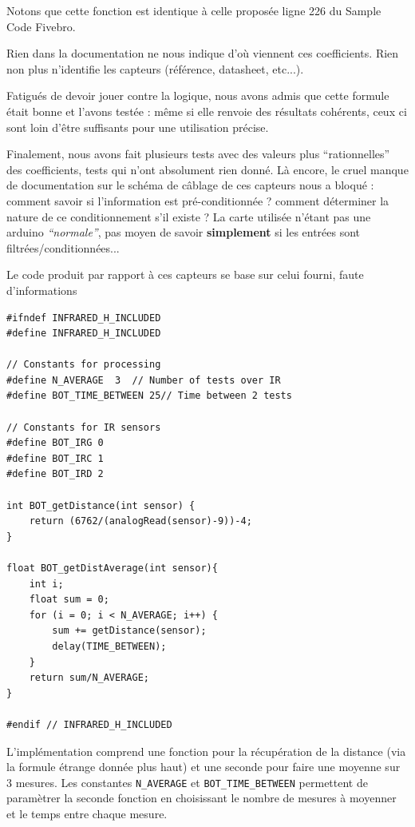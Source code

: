 \documentclass[a4paper]{report}
\begin{document}
Notons que cette fonction est identique à celle proposée ligne 226 du Sample Code Fivebro.

Rien dans la documentation ne nous indique d'où viennent ces coefficients.
Rien non plus n'identifie les capteurs (référence, datasheet, etc...).

Fatigués de devoir jouer contre la logique, nous avons admis que cette formule était bonne et l'avons testée : même si elle renvoie des résultats cohérents, ceux ci sont loin d'être suffisants pour une utilisation précise.

Finalement, nous avons fait plusieurs tests avec des valeurs plus ``rationnelles'' des coefficients, tests qui n'ont absolument rien donné.
Là encore, le cruel manque de documentation sur le schéma de câblage de ces capteurs nous a bloqué : comment savoir si l'information est pré-conditionnée ? comment déterminer la nature de ce conditionnement s'il existe ?
La carte utilisée n'étant pas une arduino \emph{``normale''}, pas moyen de savoir \textbf{simplement} si les entrées sont filtrées/conditionnées...

Le code produit par rapport à ces capteurs se base sur celui fourni, faute d'informations

\begin{verbatim}
#ifndef INFRARED_H_INCLUDED
#define INFRARED_H_INCLUDED

// Constants for processing
#define N_AVERAGE  3  // Number of tests over IR
#define BOT_TIME_BETWEEN 25// Time between 2 tests

// Constants for IR sensors
#define BOT_IRG 0
#define BOT_IRC 1
#define BOT_IRD 2

int BOT_getDistance(int sensor) {
    return (6762/(analogRead(sensor)-9))-4;
}

float BOT_getDistAverage(int sensor){
    int i;
    float sum = 0;
    for (i = 0; i < N_AVERAGE; i++) {
        sum += getDistance(sensor);
        delay(TIME_BETWEEN);
    }
    return sum/N_AVERAGE;
}

#endif // INFRARED_H_INCLUDED
\end{verbatim}

L'implémentation comprend une fonction pour la récupération de la distance (via la formule étrange donnée plus haut) et une seconde pour faire une moyenne sur 3 mesures. Les constantes \texttt{N\_AVERAGE} et \texttt{BOT\_TIME\_BETWEEN} permettent de paramètrer la seconde fonction en choisissant le nombre de mesures à moyenner et le temps entre chaque mesure.
\end{document}
